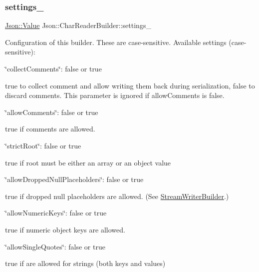 \subsubsection{\texorpdfstring{settings\+\_\+}{settings\_}}
{\footnotesize\ttfamily \hyperlink{class_json_1_1_value}{Json\+::\+Value} Json\+::\+Char\+Reader\+Builder\+::settings\+\_\+}

Configuration of this builder. These are case-\/sensitive. Available settings (case-\/sensitive)\+:
\begin{DoxyItemize}
\item {\ttfamily \char`\"{}collect\+Comments\char`\"{}\+: false or true}
\begin{DoxyItemize}
\item true to collect comment and allow writing them back during serialization, false to discard comments. This parameter is ignored if allow\+Comments is false.
\end{DoxyItemize}
\item {\ttfamily \char`\"{}allow\+Comments\char`\"{}\+: false or true}
\begin{DoxyItemize}
\item true if comments are allowed.
\end{DoxyItemize}
\item {\ttfamily \char`\"{}strict\+Root\char`\"{}\+: false or true}
\begin{DoxyItemize}
\item true if root must be either an array or an object value
\end{DoxyItemize}
\item {\ttfamily \char`\"{}allow\+Dropped\+Null\+Placeholders\char`\"{}\+: false or true}
\begin{DoxyItemize}
\item true if dropped null placeholders are allowed. (See \hyperlink{class_json_1_1_stream_writer_builder}{Stream\+Writer\+Builder}.)
\end{DoxyItemize}
\item {\ttfamily \char`\"{}allow\+Numeric\+Keys\char`\"{}\+: false or true}
\begin{DoxyItemize}
\item true if numeric object keys are allowed.
\end{DoxyItemize}
\item {\ttfamily \char`\"{}allow\+Single\+Quotes\char`\"{}\+: false or true}
\begin{DoxyItemize}
\item true if \textquotesingle{}\textquotesingle{} are allowed for strings (both keys and values)

\end{DoxyItemize}
\end{DoxyItemize}
